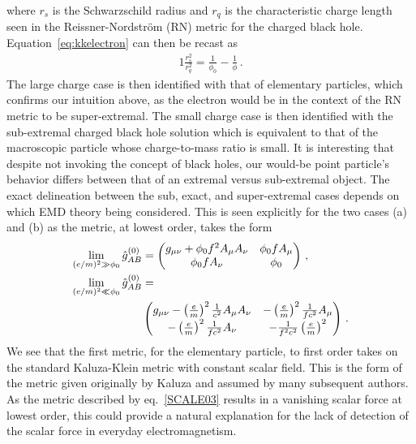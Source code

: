 where $r_{s}$ is the Schwarzschild radius and $r_{q}$ is the characteristic charge length seen in the Reissner-Nordstr{\"o}m  (RN) metric for the charged black hole. Equation~\eqref{eq:kkelectron} can then be recast as
\begin{alignat}{1}
	\label{eq:ScaleRadiusRatio}\frac{r_{s}^{2}}{r_{q}^{2}}=\frac{1}{\phi_{0}}-\frac{1}{\phi}\,.
\end{alignat}
The large charge case is then identified with that of elementary particles, which confirms our intuition above, as the electron would be in the context of the RN metric to be super-extremal. The small charge case is then identified with the sub-extremal charged black hole solution which is equivalent to that of the macroscopic particle whose charge-to-mass ratio is small. It is interesting that despite not invoking the concept of black holes, our would-be point particle's behavior differs between that of an extremal versus sub-extremal object. The exact delineation between the sub, exact, and super-extremal cases depends on which EMD theory being considered. This is seen explicitly for the two cases (a) and (b) as the metric, at lowest order, takes the form
\begin{alignat}{1}
 	\label{SCALE03} \lim_{(\text{{\scriptsize{$e/m$}}})^{2}\gg\phi_{0}}\hat{g}_{AB}^{(0)}&=
		\begin{pmatrix}
			g_{\mu\nu}+\phi_{0} f^{2}A_{\mu}A_{\nu} & \phi_{0} fA_{\mu}\\
			\phi_{0} fA_{\nu} & \phi_{0}
		\end{pmatrix}\,,\\
 	\notag\lim_{(\text{{\scriptsize{$e/m$}}})^{2}\ll\phi_{0}}\hat{g}_{AB}^{(0)}&=\\
		\label{SCALE04}&\begin{pmatrix}
			g_{\mu\nu}-\left(\frac{e}{m}\right)^{2}\frac{1}{c^{2}}A_{\mu}A_{\nu} & -\left(\frac{e}{m}\right)^{2}\frac{1}{fc^{2}}A_{\mu}\\
			-\left(\frac{e}{m}\right)^{2}\frac{1}{fc^{2}}A_{\nu} & -\frac{1}{f^{2}c^{2}}\left(\frac{e}{m}\right)^{2}
		\end{pmatrix}\,.
\end{alignat}
We see that the first metric, for the elementary particle, to first order takes on the standard Kaluza-Klein metric with constant scalar field. This is the form of the metric given originally by Kaluza and assumed by many subsequent authors. As the metric described by eq.~\eqref{SCALE03} results in a vanishing scalar force at lowest order, this could provide a natural explanation for the lack of detection of the scalar force in everyday electromagnetism. 


